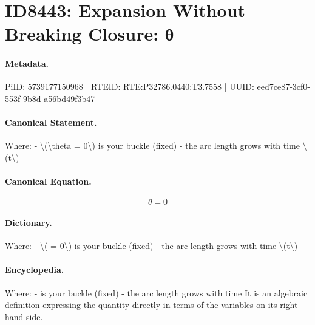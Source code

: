 \section*{ID8443: Expansion Without Breaking Closure: θ}
\paragraph{Metadata.}
PiID: 5739177150968 | RTEID: RTE:P32786.0440:T3.7558 | UUID: eed7ce87-3cf0-553f-9b8d-a56bd49f3b47

\paragraph{Canonical Statement.}
Where: - \textbackslash{}(\textbackslash{}theta = 0\textbackslash{}) is your buckle (fixed) - the arc length grows with time \textbackslash{}(t\textbackslash{})

\paragraph{Canonical Equation.}
\[
\theta = 0
\]

\paragraph{Dictionary.}
Where: - \textbackslash{}( = 0\textbackslash{}) is your buckle (fixed) - the arc length grows with time \textbackslash{}(t\textbackslash{})

\paragraph{Encyclopedia.}
Where: - is your buckle (fixed) - the arc length grows with time It is an algebraic definition expressing the quantity directly in terms of the variables on its right-hand side.
